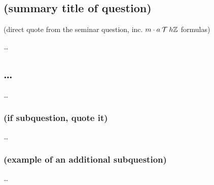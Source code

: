 \documentclass{seminar}
\begin{document}
\section{}

\subsection{(summary title of question)}
\begin{questionquote}
	(direct quote from the seminar question, inc. $m\cdot a\Rel[T] h\Z$ formulas)
\end{questionquote}

\dots


\clearpage
\subsection{\dots}
\begin{questionquote}
	\dots
\end{questionquote}

\subsubsection{(if subquestion, quote it)}
\dots

\subsubsection{(example of an additional subquestion)}
\dots
\end{document}
